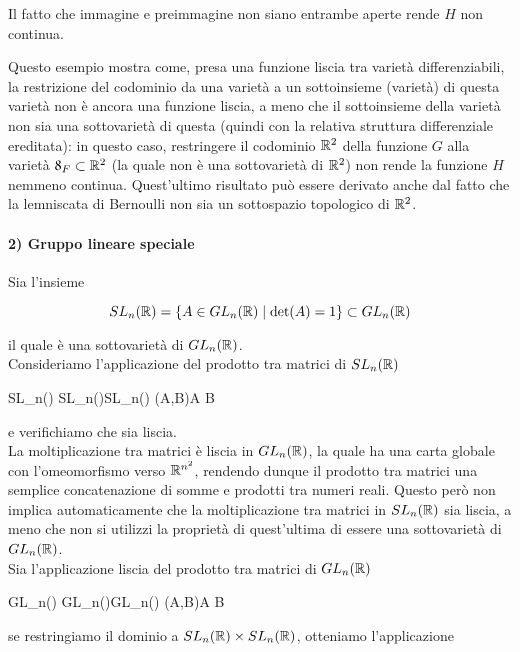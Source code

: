 Il fatto che immagine e preimmagine non siano entrambe aperte rende $ H $ non continua.


Questo esempio mostra come, presa una funzione liscia tra varietà differenziabili, la restrizione del codominio da una varietà a un sottoinsieme (varietà) di questa varietà non è ancora una funzione liscia, a meno che il sottoinsieme della varietà non sia una sottovarietà di questa (quindi con la relativa struttura differenziale ereditata): in questo caso, restringere il codominio $ \mathbb{R}^{2} $ della funzione $ G $ alla varietà $ \mathfrak{8}_{F} \subset \mathbb{R}^{2} $ (la quale non è una sottovarietà di $ \mathbb{R}^{2} $) non rende la funzione $ H $ nemmeno continua. Quest'ultimo risultato può essere derivato anche dal fatto che la lemniscata di Bernoulli non sia un sottospazio topologico di $ \mathbb{R}^{2} $.

\paragraph{2) Gruppo lineare speciale}\label{example:slnr-smooth}

Sia l'insieme

\begin{equation}
	SL_{n}(\mathbb{R}) = \{ A \in GL_{n}(\mathbb{R}) \mid \det(A) = 1 \} \subset GL_{n}(\mathbb{R})
\end{equation}

il quale è una sottovarietà di $ GL_{n}(\mathbb{R}) $. \\
Consideriamo l'applicazione del prodotto tra matrici di $ SL_{n}(\mathbb{R}) $

\map{\mu}
	{SL_{n}(\R) \times SL_{n}(\R)}{SL_{n}(\R)}
	{(A,B)}{A B}

e verifichiamo che sia liscia. \\
La moltiplicazione tra matrici è liscia in $ GL_{n}(\mathbb{R}) $, la quale ha una carta globale con l'omeomorfismo verso $ \mathbb{R}^{n^{2}} $, rendendo dunque il prodotto tra matrici una semplice concatenazione di somme e prodotti tra numeri reali. Questo però non implica automaticamente che la moltiplicazione tra matrici in $ SL_{n}(\mathbb{R}) $ sia liscia, a meno che non si utilizzi la proprietà di quest'ultima di essere una sottovarietà di $ GL_{n}(\mathbb{R}) $. \\
Sia l'applicazione liscia del prodotto tra matrici di $ GL_{n}(\mathbb{R}) $

	{GL_{n}(\R) \times GL_{n}(\R)}{GL_{n}(\R)}
	{(A,B)}{A B}

se restringiamo il dominio a $ SL_{n}(\mathbb{R}) \times SL_{n}(\mathbb{R}) $, otteniamo l'applicazione

